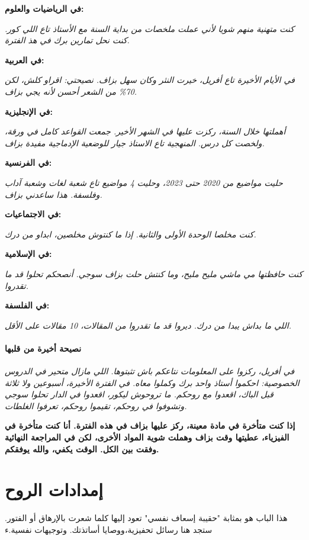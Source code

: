 \documentclass[12pt,a4paper]{book}
\newcommand{\quoteAr}[1]{%
	\begin{myquote}
		\itshape #1
	\end{myquote}
}
\newcommand{\importantAr}[1]{%
	\begin{important}
		\bfseries #1
	\end{important}
}
\begin{document}
	\textbf{في الرياضيات والعلوم:}
		\quoteAr{ كنت متهنية منهم شويا لأني عملت ملخصات من بداية السنة مع الأستاذ تاع اللي كور. كنت نحل تمارين برك في هذ الفترة.}
		
	\textbf{في العربية:}
		\quoteAr{ في الأيام الأخيرة تاع أفريل، خيرت النثر وكان سهل بزاف. نصيحتي: اقراو كلش، لكن 70\% من الشعر أحسن لأنه يجي بزاف.}
	
	\textbf{في الإنجليزية:}
		\quoteAr{	أهملتها خلال السنة، ركزت عليها في الشهر الأخير. جمعت القواعد كامل في ورقة، ولخصت كل درس. المنهجية تاع الاستاذ جيار للوضعية الإدماجية مفيدة بزاف.}
	
	\textbf{في الفرنسية:}
		\quoteAr{ حليت مواضيع من 2020 حتى 2023، وحليت 4 مواضيع تاع شعبة لغات وشعبة آداب وفلسفة. هذا ساعدني بزاف.}
	
	\textbf{في الاجتماعيات:}
		\quoteAr{	 كنت مخلصا الوحدة الأولى والثانية. إذا ما كنتوش مخلصين، ابداو من درك.}

	\textbf{في الإسلامية:}
		\quoteAr{	 كنت حافظتها مي ماشي مليح مليح، وما كنتش حلت بزاف سوجي. أنصحكم تحلوا قد ما تقدروا.}

	\textbf{في الفلسفة:}
		\quoteAr{	 اللي ما بداش يبدا من درك. ديروا قد ما تقدروا من المقالات، 10 مقالات على الأقل.}

	\subsubsection*{نصيحة أخيرة من قلبها}
	
	\quoteAr{في أفريل، ركزوا على المعلومات نتاعكم باش تثبتوها. اللي مازال متحير في الدروس الخصوصية: احكموا أستاذ واحد برك وكملوا معاه. في الفترة الأخيرة، أسبوعين ولا ثلاثة قبل الباك، اقعدوا مع روحكم. ما تروحوش ليكور، اقعدوا في الدار تحلوا سوجي وتشوفوا في روحكم، تقيموا روحكم، تعرفوا الغلطات.}
	
	\importantAr{إذا كنت متأخرة في مادة معينة، ركز عليها بزاف في هذه الفترة. أنا كنت متأخرة في الفيزياء، عطيتها وقت بزاف وهملت شوية المواد الأخرى، لكن في المراجعة النهائية وفقت بين الكل. الوقت يكفي، والله يوفقكم.}
	
	
	
	
	\chapter{إمدادات الروح}
	\label{chap:soul}
	
	هذا الباب هو بمثابة "حقيبة إسعاف نفسي" تعود إليها كلما شعرت بالإرهاق أو الفتور. ستجد هنا رسائل تحفيزية،ووصايا أساتذتك. وتوجيهات نفسية.ء
	
\end{document}
